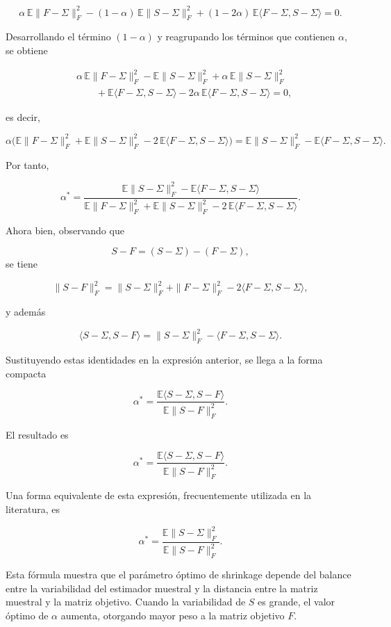 \documentclass[letterpaper,12pt,oneside]{book}
\begin{document}
\[
\alpha \,\mathbb{E}\|F-\Sigma\|_F^2
-(1-\alpha)\,\mathbb{E}\|S-\Sigma\|_F^2
+
(1-2\alpha)\,\mathbb{E}\langle F-\Sigma,S-\Sigma\rangle
=0.
\]

Desarrollando el término $(1-\alpha)$ y reagrupando los términos que contienen $\alpha$, se obtiene

\[
\begin{aligned}
&\alpha \,\mathbb{E}\|F-\Sigma\|_F^2
-\mathbb{E}\|S-\Sigma\|_F^2
+\alpha\,\mathbb{E}\|S-\Sigma\|_F^2 \\
&\qquad
+\mathbb{E}\langle F-\Sigma,S-\Sigma\rangle
-2\alpha\,\mathbb{E}\langle F-\Sigma,S-\Sigma\rangle
=0,
\end{aligned}
\]

es decir,

\[
\alpha \Big(
\mathbb{E}\|F-\Sigma\|_F^2
+
\mathbb{E}\|S-\Sigma\|_F^2
-
2\,\mathbb{E}\langle F-\Sigma,S-\Sigma\rangle
\Big)
=
\mathbb{E}\|S-\Sigma\|_F^2
-
\mathbb{E}\langle F-\Sigma,S-\Sigma\rangle.
\]

Por tanto,

\[
\alpha^*
=
\frac{
\mathbb{E}\|S-\Sigma\|_F^2
-
\mathbb{E}\langle F-\Sigma,S-\Sigma\rangle
}{
\mathbb{E}\|F-\Sigma\|_F^2
+
\mathbb{E}\|S-\Sigma\|_F^2
-
2\,\mathbb{E}\langle F-\Sigma,S-\Sigma\rangle
}.
\]

Ahora bien, observando que

\[
S-F = (S-\Sigma) - (F-\Sigma),
\]
se tiene

\[
\|S-F\|_F^2
=
\|S-\Sigma\|_F^2
+
\|F-\Sigma\|_F^2
-
2\langle F-\Sigma,S-\Sigma\rangle,
\]

y además

\[
\langle S-\Sigma,S-F\rangle
=
\|S-\Sigma\|_F^2
-
\langle F-\Sigma,S-\Sigma\rangle.
\]

Sustituyendo estas identidades en la expresión anterior, se llega a la forma compacta

\[
\alpha^*
=
\frac{
\mathbb{E}\langle S-\Sigma,S-F\rangle
}{
\mathbb{E}\|S-F\|_F^2
}.
\]

El resultado es

\[
\alpha^*
=
\frac{
\mathbb{E}\langle S-\Sigma,S-F\rangle
}{
\mathbb{E}\|S-F\|_F^2
}.
\]

Una forma equivalente de esta expresión, frecuentemente utilizada en la literatura, es

\[
\alpha^*
=
\frac{
\mathbb{E}\|S-\Sigma\|_F^2
}{
\mathbb{E}\|S-F\|_F^2
}.
\]

Esta fórmula muestra que el parámetro óptimo de shrinkage depende del balance entre la variabilidad del estimador muestral y la distancia entre la matriz muestral y la matriz objetivo. Cuando la variabilidad de $S$ es grande, el valor óptimo de $\alpha$ aumenta, otorgando mayor peso a la matriz objetivo $F$.
\end{document}
